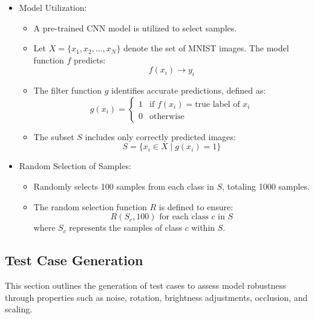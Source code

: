 \documentclass[10pt, conference, a4paper, final]{IEEEtran}
\begin{document}
\begin{itemize}

    
        \item Model Utilization:
            \begin{itemize}
                \item A pre-trained CNN model is utilized to select samples.
                \item Let \( X = \{x_1, x_2, \dots, x_N\} \) denote the set of MNIST images. The model function \( f \) predicts:
                \[ f(x_i) \rightarrow y_i \]
                \item The filter function \( g \) identifies accurate predictions, defined as:
                \[ g(x_i) = 
                \begin{cases} 
                1 & \text{if } f(x_i) = \text{true label of } x_i \\
                0 & \text{otherwise}
                \end{cases} \]
                \item The subset \( S \) includes only correctly predicted images:
                \[ S = \{x_i \in X \mid g(x_i) = 1\} \]
            \end{itemize}
        \item Random Selection of Samples:
            \begin{itemize}
                \item Randomly selects 100 samples from each class in \( S \), totaling 1000 samples.
                \item The random selection function \( R \) is defined to ensure:
                \[ R(S_c, 100) \text{ for each class } c \text{ in } S \]
                where \( S_c \) represents the samples of class \( c \) within \( S \).
            \end{itemize}

\end{itemize}


\subsection{Test Case Generation}

This section outlines the generation of test cases to assess model robustness through properties such as noise, rotation, brightness adjustments, occlusion, and scaling.
\end{document}
